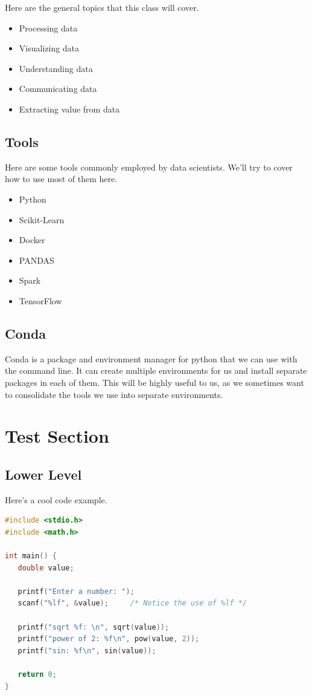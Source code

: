 \documentclass[english, 10pt]{article}
\begin{document}
Here are the general topics that this class will cover.

\begin{itemize}
	\item Processing data
	\item Visualizing data
	\item Understanding data
	\item Communicating data
	\item Extracting value from data
\end{itemize}

\subsection{Tools}

Here are some tools commonly employed by data scientists. We'll try to cover how to use most of them here.

\begin{itemize}
	\item Python
	\item Scikit-Learn
	\item Docker
	\item PANDAS
	\item Spark
	\item TensorFlow
\end{itemize}

\subsection{Conda}

Conda is a package and environment manager for python that we can use with the command line.
It can create multiple environments for us and install separate packages in each of them.
This will be highly useful to us, as we sometimes want to consolidate the tools we use into separate environments.

\section{Test Section}

\subsection{Lower Level}

Here's a cool code example.

{\centering
\begin{lstlisting}[language=C]
#include <stdio.h>
#include <math.h>

int main() {
   double value;

   printf("Enter a number: ");
   scanf("%lf", &value);     /* Notice the use of %lf */

   printf("sqrt %f: \n", sqrt(value));
   printf("power of 2: %f\n", pow(value, 2));
   printf("sin: %f\n", sin(value));

   return 0;
}
\end{lstlisting}
}
\end{document}

